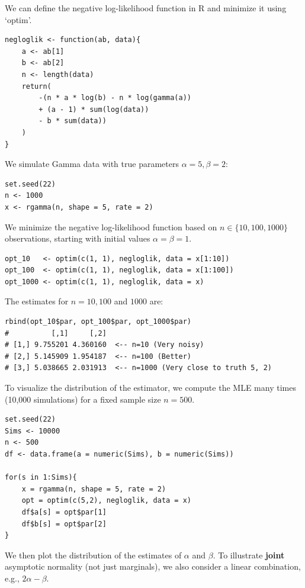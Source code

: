 We can define the negative log-likelihood function in R and minimize it using `optim'.

\begin{verbatim}
negloglik <- function(ab, data){
    a <- ab[1]
    b <- ab[2]
    n <- length(data)
    return(
        -(n * a * log(b) - n * log(gamma(a))
        + (a - 1) * sum(log(data))
        - b * sum(data))
    )
}
\end{verbatim}

We simulate Gamma data with true parameters \(\alpha=5, \beta=2\):

\begin{verbatim}
set.seed(22)
n <- 1000
x <- rgamma(n, shape = 5, rate = 2)
\end{verbatim}

We minimize the negative log-likelihood function based on \(n \in \{10, 100, 1000\}\) observations, starting with initial values \(\alpha = \beta = 1\).

\begin{verbatim}
opt_10   <- optim(c(1, 1), negloglik, data = x[1:10])
opt_100  <- optim(c(1, 1), negloglik, data = x[1:100])
opt_1000 <- optim(c(1, 1), negloglik, data = x)
\end{verbatim}

The estimates for \(n = 10, 100\) and \(1000\) are:

\begin{verbatim}
rbind(opt_10$par, opt_100$par, opt_1000$par)
#          [,1]     [,2]
# [1,] 9.755201 4.360160  <-- n=10 (Very noisy)
# [2,] 5.145909 1.954187  <-- n=100 (Better)
# [3,] 5.038665 2.031913  <-- n=1000 (Very close to truth 5, 2)
\end{verbatim}

To visualize the distribution of the estimator, we compute the MLE many times (10,000 simulations) for a fixed sample size \(n = 500\).

\begin{verbatim}
set.seed(22)
Sims <- 10000
n <- 500
df <- data.frame(a = numeric(Sims), b = numeric(Sims))

for(s in 1:Sims){
    x = rgamma(n, shape = 5, rate = 2)
    opt = optim(c(5,2), negloglik, data = x)
    df$a[s] = opt$par[1]
    df$b[s] = opt$par[2]
}
\end{verbatim}

We then plot the distribution of the estimates of \(\alpha\) and \(\beta\). To illustrate \textbf{joint} asymptotic normality (not just marginals), we also consider a linear combination, e.g., \(2\alpha - \beta\).

